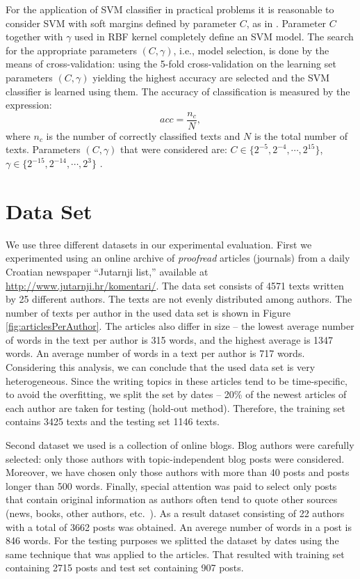 \documentclass{llncs}
\begin{document}
For the application of SVM classifier in practical problems it is reasonable to
consider SVM with soft margins defined by parameter $C$, as in
\cite{cortes1995support}. Parameter $C$ together with $\gamma$ used in RBF kernel
completely define an SVM model. The search for the appropriate parameters $(C,
\gamma)$, i.e., model selection, is done by the means of cross-validation: using
the 5-fold cross-validation on the learning set parameters $(C, \gamma)$ yielding
the highest accuracy are selected and the SVM classifier is learned using them.
The accuracy of classification is measured by the expression:
\begin{equation}
acc = \frac{n_c}{N}, %
\end{equation}
where $n_c$ is the number of correctly classified texts and $N$ is the total number of
texts.
Parameters $(C, \gamma)$ that were considered are: $C \in \{2^{-5}, 2^{-4},
\cdots , 2^{15}\}$, $\gamma \in \{2^{-15}, 2^{-14}, \cdots, 2^3\}$ \cite{CC01a}.

\section{Data Set}
\label{sec:podatci}
We use three different datasets in our experimental evaluation. First we
experimented using an online archive of \emph{proofread} articles (journals) from
a daily Croatian newspaper ``Jutarnji list,'' available at
\url{http://www.jutarnji.hr/komentari/}. The data set consists of 4571 texts
written by 25 different authors. The texts are not evenly distributed among
authors. The number of texts per author in the used data set is shown in Figure
\ref{fig:articlesPerAuthor}. The articles also differ in size -- the lowest
average number of words in the text per author is 315 words, and the highest
average is 1347 words. An average number of words in a text per author is 717
words. Considering this analysis, we can conclude that the used data set is very
heterogeneous. Since the writing topics in these articles tend to be
time-specific, to avoid the overfitting, we split the set by dates -- 20\% of the
newest articles of each author are taken for testing (hold-out method).
Therefore, the training set contains 3425 texts and the testing set 1146 texts.

Second dataset we used is a collection of online blogs. Blog authors were
carefully selected: only those authors with topic-independent blog posts were
considered. Moreover, we have chosen only those authors with more than 40 posts
and posts longer than 500 words. Finally, special attention was paid to select
only posts that contain original information as authors often tend to
quote other sources (news, books, other authors, etc.~). As a result dataset
consisting of 22 authors with a total of 3662 posts was obtained. An
averege number of words in a post is 846 words. For the testing purposes we
splitted the dataset by dates using the same technique that was applied to the
articles. That resulted with training set containing 2715 posts and test set
containing 907 posts.
\end{document}
